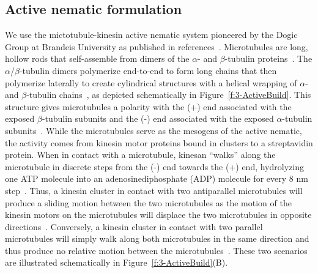 \subsection{Active nematic formulation}
We use the mictotubule-kinesin active nematic system pioneered by the Dogic Group at Brandeis University as published in references~\cite{RN3,RN27,RN9,RN135,RN134}.
Microtubules are long, hollow rods that self-assemble from dimers of the $\alpha$- and $\beta$-tubulin proteins~\cite{RN248}.
The $\alpha$/$\beta$-tubulin dimers polymerize end-to-end to form long chains that then polymerize laterally to create cylindrical structures with a helical wrapping of $\alpha$- and $\beta$-tubulin chains~\cite{RN248,RN249}, as depicted schematically in Figure~\ref{f:3-ActiveBuild}.
This structure gives microtubules a polarity with the (+) end associated with the exposed $\beta$-tubulin subunits and the (-) end associated with the exposed $\alpha$-tubulin subunits~\cite{RN248,RN249}.
While the microtubules serve as the mesogens of the active nematic, the activity comes from kinesin motor proteins bound in clusters to a streptavidin protein.
When in contact with a microtubule, kinesan ``walks'' along the microtubule in discrete steps from the (-) end towards the (+) end, hydrolyzing one ATP molecule into an adenosinediphosphate (ADP) molecule for every 8 nm step~\cite{RN250}.
Thus, a kinesin cluster in contact with two antiparallel microtubules will produce a sliding motion between the two microtubules as the motion of the kinesin motors on the microtubules will displace the two microtubules in opposite directions~\cite{RN4,RN3}.
Conversely, a kinesin cluster in contact with two parallel microtubules will simply walk along both microtubules in the same direction and thus produce no relative motion between the microtubules~\cite{RN4,RN3}. These two scenarios are illustrated schematically in Figure~\ref{f:3-ActiveBuild}(B).
